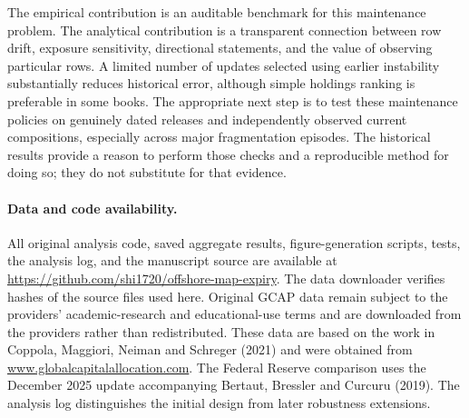 \documentclass[11pt,a4paper]{article}
\begin{document}
The empirical contribution is an auditable benchmark for this maintenance problem. The analytical contribution is a transparent connection between row drift, exposure sensitivity, directional statements, and the value of observing particular rows. A limited number of updates selected using earlier instability substantially reduces historical error, although simple holdings ranking is preferable in some books. The appropriate next step is to test these maintenance policies on genuinely dated releases and independently observed current compositions, especially across major fragmentation episodes. The historical results provide a reason to perform those checks and a reproducible method for doing so; they do not substitute for that evidence.

\paragraph{Data and code availability.}
All original analysis code, saved aggregate results, figure-generation scripts, tests, the analysis log, and the manuscript source are available at \url{https://github.com/shi1720/offshore-map-expiry}. The data downloader verifies hashes of the source files used here. Original GCAP data remain subject to the providers' academic-research and educational-use terms and are downloaded from the providers rather than redistributed. These data are based on the work in Coppola, Maggiori, Neiman and Schreger (2021) and were obtained from \url{www.globalcapitalallocation.com}. The Federal Reserve comparison uses the December 2025 update accompanying Bertaut, Bressler and Curcuru (2019). The analysis log distinguishes the initial design from later robustness extensions.
\end{document}
